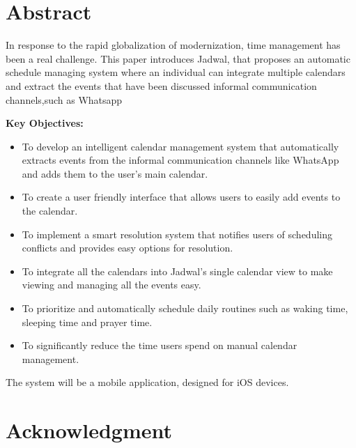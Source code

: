 \documentclass[12pt,a4paper]{report}
\begin{document}
\begin{singlespace}

    \chapter*{Abstract}

    \begin{justify}
        In response to the rapid globalization of modernization, time management has been a real challenge. This paper introduces Jadwal, that proposes an automatic schedule managing system where an individual can integrate multiple calendars and extract the events that have been discussed informal communication channels,such as Whatsapp

        \textbf{Key Objectives:}
        \begin{itemize}
            \item To develop an intelligent calendar management system that automatically extracts events from the informal communication channels like WhatsApp and adds them to the user's main calendar.
            \item To create a user friendly interface that allows users to easily add events to the calendar.
            \item To implement a smart resolution system that notifies users of scheduling conflicts and provides easy options for resolution.
            \item To integrate all the calendars into Jadwal's single calendar view to make viewing and managing all the events easy.
            \item To prioritize and automatically schedule daily routines such as waking time, sleeping time and prayer time.
            \item To significantly reduce the time users spend on manual calendar management.

        \end{itemize}


        \begin{center}
            The system will be a mobile application, designed for iOS devices.
        \end{center}
    \end{justify}


    \chapter*{Acknowledgment}


\end{singlespace}
\end{document}
